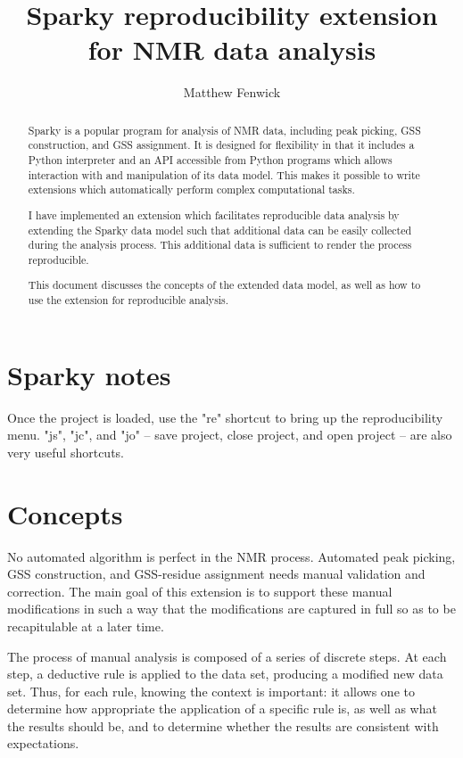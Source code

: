 \documentclass[11pt,a4paper]{article}
\begin{document}
\author{Matthew Fenwick}
\title{Sparky reproducibility extension for NMR data analysis}
\maketitle

\begin{abstract}
Sparky \cite{sparky} 
is a popular program for analysis of NMR data, including peak picking,
GSS construction, and GSS assignment.  It is designed for flexibility in that
it includes a Python interpreter and an API accessible from Python programs
which allows interaction with and manipulation of its data model.  This makes
it possible to write extensions which automatically perform complex
computational tasks.

I have implemented an extension which facilitates reproducible data analysis
by extending the Sparky data model such that additional data can be easily
collected during the analysis process.  This additional data is sufficient
to render the process reproducible.

This document discusses the concepts of the extended data model, as well as
how to use the extension for reproducible analysis.
\end{abstract}

\tableofcontents
\listoftables
\listoffigures


\section{Sparky notes}
Once the project is loaded, use the "re" shortcut to bring up the 
reproducibility menu.  "js", "jc", and "jo" -- save project, close project,
and open project -- are also very useful shortcuts.


\section{Concepts}

No automated algorithm is perfect in the NMR process.  Automated peak picking,
GSS construction, and GSS-residue assignment needs manual validation and
correction.  The main goal of this extension is to support these manual
modifications in such a way that the modifications are captured in full so
as to be recapitulable at a later time.

The process of manual analysis is composed of a series of discrete steps.
At each step, a deductive rule is applied to the data set, producing a
modified new data set.  Thus, for each rule, knowing the context is important:
it allows one to determine how appropriate the application of a specific rule
is, as well as what the results should be, and to determine whether the 
results are consistent with expectations.
\end{document}
